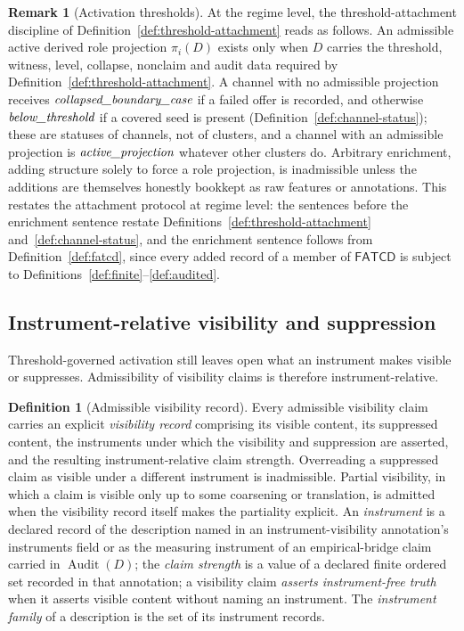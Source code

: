 \documentclass[11pt]{article}
\theoremstyle{definition}
\newtheorem{definition}[theorem]{Definition}
\newtheorem{remark}[theorem]{Remark}
\newcommand{\FATCD}{\ensuremath{\mathsf{FATCD}}}
\newcommand{\Audit}[1]{\ensuremath{\operatorname{Audit}\!\left(#1\right)}}
\newcommand{\activeproj}{\textit{active\_\allowbreak projection}}
\newcommand{\belowthr}{\textit{below\_\allowbreak threshold}}
\newcommand{\collapsedbc}{\textit{collapsed\_\allowbreak boundary\_\allowbreak case}}
\begin{document}
\begin{remark}[Activation thresholds]\label{prop:activation-thresholds}
At the regime level, the threshold-attachment discipline of
Definition~\ref{def:threshold-attachment} reads as follows. An
admissible active derived role projection \(\pi_i(D)\) exists only when
\(D\) carries the threshold, witness, level, collapse, nonclaim and audit data
required by Definition~\ref{def:threshold-attachment}. A channel with no
admissible projection receives \(\collapsedbc\) if a failed offer is
recorded, and otherwise \(\belowthr\) if a covered seed is present
(Definition~\ref{def:channel-status}); these are statuses of channels, not of
clusters, and a channel with an admissible projection is \(\activeproj\)
whatever other clusters do. Arbitrary enrichment, adding structure
solely to force a role projection, is inadmissible unless the additions
are themselves honestly bookkept as raw features or annotations. This
restates the attachment protocol at regime level: the sentences before the
enrichment sentence restate Definitions~\ref{def:threshold-attachment}
and~\ref{def:channel-status}, and the enrichment sentence
follows from Definition~\ref{def:fatcd}, since every added record of a member of
\FATCD{} is subject to Definitions~\ref{def:finite}--\ref{def:audited}.
\end{remark}

\subsection{Instrument-relative visibility and suppression}\label{subsec:visibility-suppression}

Threshold-governed activation still leaves open what an instrument makes
visible or suppresses. Admissibility of visibility claims is therefore
instrument-relative.

\begin{definition}[Admissible visibility record]\label{prop:visibility}
Every admissible visibility claim carries an explicit \emph{visibility record}
comprising its visible content, its suppressed content, the instruments
under which the visibility and suppression are asserted, and the
resulting instrument-relative claim strength. Overreading a suppressed
claim as visible under a different instrument is inadmissible. Partial
visibility, in which a claim is visible only up to some coarsening or
translation, is admitted when the visibility record itself makes the
partiality explicit. An \emph{instrument} is a declared record of the
description named in an instrument-visibility annotation's instruments field
or as the measuring instrument of an empirical-bridge claim carried in
\(\Audit{D}\); the \emph{claim strength} is a value of a declared finite ordered
set recorded in that annotation; a visibility claim \emph{asserts
instrument-free truth} when it asserts visible content without naming an
instrument. The \emph{instrument family} of a description is the set of its
instrument records.
\end{definition}
\end{document}
